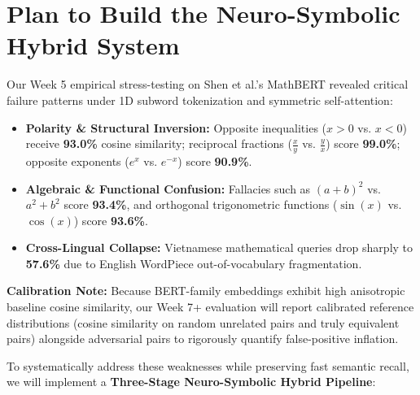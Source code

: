 ﻿\documentclass[11pt,a4paper]{article}
\begin{document}
	\section{Plan to Build the Neuro-Symbolic Hybrid System}
	Our Week 5 empirical stress-testing on Shen et al.'s MathBERT revealed critical failure patterns under 1D subword tokenization and symmetric self-attention:
	\begin{itemize}
		\item \textbf{Polarity \& Structural Inversion:} Opposite inequalities ($x > 0$ vs. $x < 0$) receive \textbf{93.0\%} cosine similarity; reciprocal fractions ($\frac{x}{y}$ vs. $\frac{y}{x}$) score \textbf{99.0\%}; opposite exponents ($e^x$ vs. $e^{-x}$) score \textbf{90.9\%}.
		\item \textbf{Algebraic \& Functional Confusion:} Fallacies such as $(a+b)^2$ vs. $a^2+b^2$ score \textbf{93.4\%}, and orthogonal trigonometric functions ($\sin(x)$ vs. $\cos(x)$) score \textbf{93.6\%}.
		\item \textbf{Cross-Lingual Collapse:} Vietnamese mathematical queries drop sharply to \textbf{57.6\%} due to English WordPiece out-of-vocabulary fragmentation.
	\end{itemize}

	\noindent \textbf{Calibration Note:} Because BERT-family embeddings exhibit high anisotropic baseline cosine similarity, our Week 7+ evaluation will report calibrated reference distributions (cosine similarity on random unrelated pairs and truly equivalent pairs) alongside adversarial pairs to rigorously quantify false-positive inflation.

	To systematically address these weaknesses while preserving fast semantic recall, we will implement a \textbf{Three-Stage Neuro-Symbolic Hybrid Pipeline}:
\end{document}
